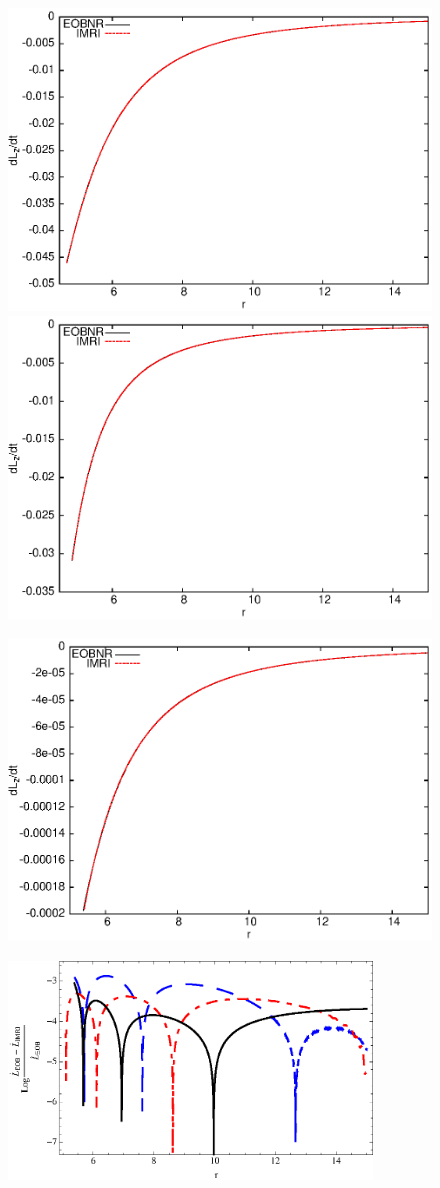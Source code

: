 \begin{figure}[ht]
\centerline{
\includegraphics[height=0.38\textwidth,  clip]{figures/insimri/lzdotp17100}
\includegraphics[height=0.38\textwidth,  clip]{figures/insimri/lzdotp10100}
}
\centerline{
\includegraphics[height=0.38\textwidth,  clip]{figures/insimri/lzdotp1100}
\includegraphics[height=2.6in, width=3.8in,  clip]{figures/insimri/facc}
}

\end{figure}
